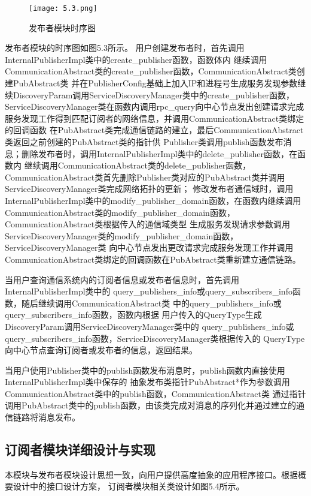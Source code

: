 \begin{figure}[htb]
  \centering
  \texttt{[image: 5.3.png]}
  \caption{发布者模块时序图}
  \label{fig:3}
\end{figure}

发布者模块的时序图如图5.3所示。
用户创建发布者时，首先调用InternalPublisherImpl类中的create\_publisher函数，函数体内
继续调用CommunicationAbstract类的create\_publisher函数，CommunicationAbstract类创建PubAbstract类
并在PublisherConfig基础上加入IP和进程号生成服务发现参数继续DiscoveryParam调用ServiceDiscoveryManager类中的create\_publisher函数，
ServiceDiscoveryManager类在函数内调用rpc\_query向中心节点发出创建请求完成服务发现工作得到匹配订阅者的网络信息，并调用CommunicationAbstract类绑定的回调函数
在PubAbstract类完成通信链路的建立，最后CommunicationAbstract类返回之前创建的PubAbstract类的指针供
Publisher类调用publish函数发布消息；删除发布者时，调用InternalPublisherImpl类中的delete\_publisher函数，在函数内
继续调用CommunicationAbstract类的delete\_publisher函数，
CommunicationAbstract类首先删除Publisher类对应的PubAbstract类并调用ServiceDiscoveryManager类完成网络拓扑的更新；
修改发布者通信域时，调用InternalPublisherImpl类中的modify\_publisher\_domain函数，在函数内继续调用
CommunicationAbstract类的modify\_publisher\_domain函数，CommunicationAbstract类根据传入的通信域类型
生成服务发现请求参数调用ServiceDiscoveryManager类的modify\_publisher\_domain函数，ServiceDiscoveryManager类
向中心节点发出更改请求完成服务发现工作并调用CommunicationAbstract类绑定的回调函数在PubAbstract类重新建立通信链路。

当用户查询通信系统内的订阅者信息或发布者信息时，首先调用InternalPublisherImpl类中的
query\_publishers\_info或query\_subscribers\_info函数，随后继续调用CommunicationAbstract类
中的query\_publishers\_info或query\_subscribers\_info函数，函数内根据
用户传入的QueryType生成DiscoveryParam调用ServiceDiscoveryManager类中的
query\_publishers\_info或query\_subscribers\_info函数，ServiceDiscoveryManager类根据传入的
QueryType向中心节点查询订阅者或发布者的信息，返回结果。

当用户使用Publisher类中的publish函数发布消息时，publish函数内直接使用InternalPublisherImpl类中保存的
抽象发布类指针PubAbstract*作为参数调用CommunicationAbstract类中的publish函数，CommunicationAbstract类
通过指针调用PubAbstract类中的publish函数，由该类完成对消息的序列化并通过建立的通信链路将消息发布。

\subsection{订阅者模块详细设计与实现}
本模块与发布者模块设计思想一致，向用户提供高度抽象的应用程序接口。根据概要设计中的接口设计方案，
订阅者模块相关类设计如图5.4所示。

